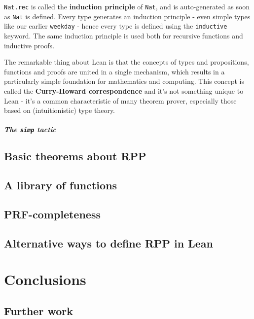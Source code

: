 \documentclass{book}
\theoremstyle{definition}
\theoremstyle{remark}
\theoremstyle{plain}
\begin{document}
\lstinline{Nat.rec} is called the \textbf{induction principle} of \lstinline{Nat},
and is auto-generated as soon as \lstinline{Nat} is defined.
Every type generates an induction principle - even simple types like our earlier \lstinline{weekday} -
hence every type is defined using the \lstinline{inductive} keyword.
The same induction principle is used both for recursive functions and inductive proofs.

The remarkable thing about Lean is that the concepts of types and propositions, functions and proofs are united in a single mechanism,
which results in a particularly simple foundation for mathematics and computing.
This concept is called the \textbf{Curry-Howard correspondence} and it's not something unique to Lean -
it's a common characteristic of many theorem prover, especially those based on (intuitionistic) type theory.

\paragraph{The \lstinline{simp} tactic}

\section{Basic theorems about RPP}

\section{A library of functions}

\section{PRF-completeness}

\section{Alternative ways to define RPP in Lean}

\chapter{Conclusions}

\section{Further work}
\end{document}
